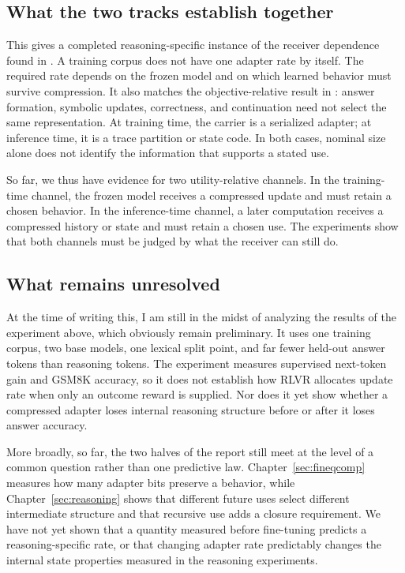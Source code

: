 \subsection{What the two tracks establish together}

This gives a completed reasoning-specific instance of the receiver dependence found in . A training corpus does not have one adapter rate by itself. The required rate depends on the frozen model and on which learned behavior must survive compression. It also matches the objective-relative result in : answer formation, symbolic updates, correctness, and continuation need not select the same representation. At training time, the carrier is a serialized adapter; at inference time, it is a trace partition or state code. In both cases, nominal size alone does not identify the information that supports a stated use.

So far, we thus have evidence for two utility-relative channels. In the training-time channel, the frozen model receives a compressed update and must retain a chosen behavior. In the inference-time channel, a later computation receives a compressed history or state and must retain a chosen use. The experiments show that both channels must be judged by what the receiver can still do.

\subsection{What remains unresolved}

At the time of writing this, I am still in the midst of analyzing the results of the experiment above, which obviously remain preliminary. It uses one training corpus, two base models, one lexical split point, and far fewer held-out answer tokens than reasoning tokens. The experiment measures supervised next-token gain and GSM8K accuracy, so it does not establish how RLVR allocates update rate when only an outcome reward is supplied. Nor does it yet show whether a compressed adapter loses internal reasoning structure before or after it loses answer accuracy.

More broadly, so far, the two halves of the report still meet at the level of a common question rather than one predictive law. Chapter~\ref{sec:fineqcomp} measures how many adapter bits preserve a behavior, while Chapter~\ref{sec:reasoning} shows that different future uses select different intermediate structure and that recursive use adds a closure requirement. We have not yet shown that a quantity measured before fine-tuning predicts a reasoning-specific rate, or that changing adapter rate predictably changes the internal state properties measured in the reasoning experiments.

